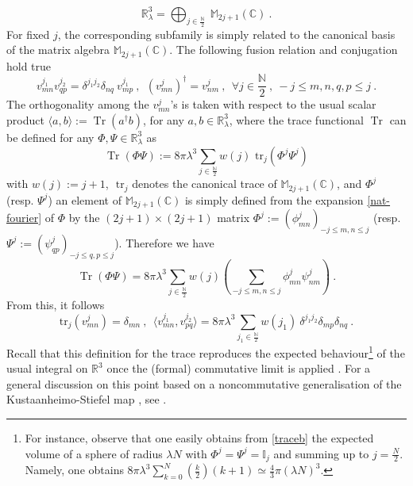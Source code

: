 \documentclass[a4paper,11pt,twoside]{article}
\numberwithin{equation}{section}
\newcommand\bbone{{ \mathbb{I}}}
\DeclareMathOperator{\tr}{Tr}
\theoremstyle{nonumberplain}
\newcounter{and}
\begin{document}
%
\begin{equation*}
\mathbb{R}^3_\lambda = \bigoplus_{j\in\frac{\mathbb{N}}{2}} \ \mathbb{M}_{2j+1}(\mathbb{C}) \ . 
\end{equation*}
%
For fixed $j$, the corresponding subfamily is simply related to the canonical basis of the matrix algebra $\mathbb{M}_{2j+1}(\mathbb{C})$. The following fusion relation and conjugation hold true%
%
\begin{equation}
v^{j_1}_{mn} v^{j_2}_{qp} = \delta^{j_1j_2} \delta_{nq} \ v^{j_1}_{mp} \ , \ \ (v^j_{mn})^\dag=v^j_{nm} \ , \ \ 
\forall j\in\frac{\mathbb{N}}{2} \ , \ -j\le m,n,q,p\le j \ . \label{fusion}
\end{equation}
%
The orthogonality among the $v^j_{mn}$'s is taken with respect to the usual scalar product $\langle a,b\rangle:=\tr(a^\dag b)$, for any $a,b\in\mathbb{R}^3_\lambda$, where the trace functional $\tr$ can be defined \cite{gervitwal-13} for any $\Phi,\Psi\in\mathbb{R}^3_\lambda$ as%
%
\begin{equation*}
\tr(\Phi\Psi) := 8 \pi \lambda^3 \sum_{j\in\frac{\mathbb{N}}{2}} w(j) \mbox{ tr}_j(\Phi^j\Psi^j)
\end{equation*}
%
with $w(j) := j+1$, $\mbox{ tr}_j$ denotes the canonical trace of $\mathbb{M}_{2j+1}(\mathbb{C})$, and $\Phi^j$ (resp. $\Psi^j$) an element of $\mathbb{M}_{2j+1}(\mathbb{C})$ is simply defined from the expansion \eqref{nat-fourier} of $\Phi$ by the $(2j+1)\times(2j+1)$ matrix $\Phi^j:=(\phi^j_{mn})_{-j\le m,n\le j}$ (resp. $\Psi^j:= (\psi^j_{qp})_{-j\le q,p\le j}$). Therefore we have%
%
\begin{equation}
\tr(\Phi\Psi)  = 8 \pi \lambda^3 \sum_{j\in\frac{\mathbb{N}}{2}} w(j) \left( \sum_{-j\le m,n\le j}\phi^j_{mn}\psi^j_{nm}\right) \ . \label{traceb} 
\end{equation}
%
From this, it follows%
%
\begin{equation}
\mbox{tr}_j(v^j_{mn}) = \delta_{mn} \ , \ \
\langle v^{j_1}_{mn} , v^{j_2}_{pq} \rangle = 8 \pi \lambda^3 \sum_{j_1\in\frac{\mathbb{N}}{2}} w(j_1) \ \delta^{j_1j_2} \delta_{mp} \delta_{nq} \ . \label{ortho-normaliz}
\end{equation}
%
Recall that this definition for the trace reproduces the expected behaviour{\footnote{For instance, observe that one easily obtains from \eqref{traceb} the expected volume of a sphere of radius $\lambda N$ with $\Phi^j=\Psi^j=\bbone_j$ and summing up to $j=\frac{N}{2}$. Namely, one obtains $8\pi\lambda^3\sum_{k=0}^{N}(\frac{k}{2})(k+1)\simeq\frac{4}{3}\pi(\lambda N)^3$.}} of the usual integral on $\mathbb{R}^3$ once the (formal) commutative limit is applied \cite{gervitwal-13}. For a general discussion on this point based on a noncommutative generalisation of the Kustaanheimo-Stiefel map \cite{ksmap}, see \cite{pv-ksmap}. \par%
\end{document}
